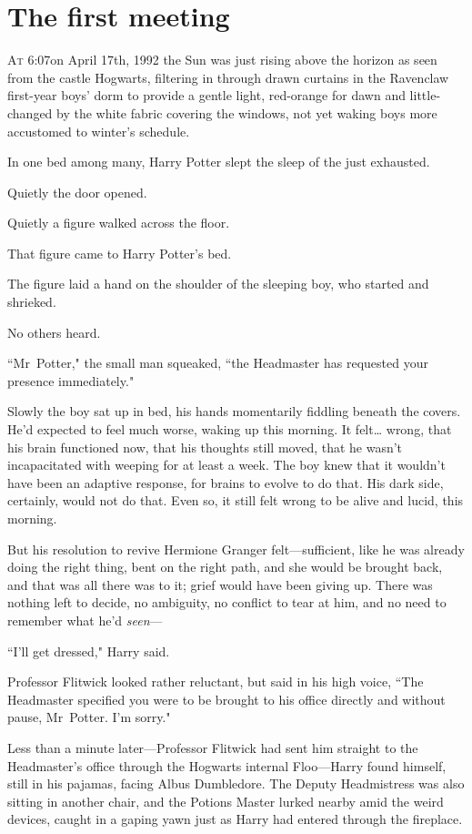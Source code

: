 
\section{The first meeting}

\lettrine{A}{t} 6:07\am on April 17th, 1992 the Sun was just rising above the horizon as seen from the castle Hogwarts, filtering in through drawn curtains in the Ravenclaw first-year boys' dorm to provide a gentle light, red-orange for dawn and little-changed by the white fabric covering the windows, not yet waking boys more accustomed to winter's schedule.

In one bed among many, Harry Potter slept the sleep of the just exhausted.

Quietly the door opened.

Quietly a figure walked across the floor.

That figure came to Harry Potter's bed.

The figure laid a hand on the shoulder of the sleeping boy, who started and shrieked.

No others heard.

``Mr~Potter," the small man squeaked, ``the Headmaster has requested your presence immediately."

Slowly the boy sat up in bed, his hands momentarily fiddling beneath the covers. He'd expected to feel much worse, waking up this morning. It felt{\ldots} wrong, that his brain functioned now, that his thoughts still moved, that he wasn't incapacitated with weeping for at least a week. The boy knew that it wouldn't have been an adaptive response, for brains to evolve to do that. His dark side, certainly, would not do that. Even so, it still felt wrong to be alive and lucid, this morning.

But his resolution to revive Hermione Granger felt—sufficient, like he was already doing the right thing, bent on the right path, and she would be brought back, and that was all there was to it; grief would have been giving up. There was nothing left to decide, no ambiguity, no conflict to tear at him, and no need to remember what he'd \emph{seen}—

``I'll get dressed," Harry said.

Professor Flitwick looked rather reluctant, but said in his high voice, ``The Headmaster specified you were to be brought to his office directly and without pause, Mr~Potter. I'm sorry."

Less than a minute later—Professor Flitwick had sent him straight to the Headmaster's office through the Hogwarts internal Floo—Harry found himself, still in his pajamas, facing Albus Dumbledore. The Deputy Headmistress was also sitting in another chair, and the Potions Master lurked nearby amid the weird devices, caught in a gaping yawn just as Harry had entered through the fireplace.

